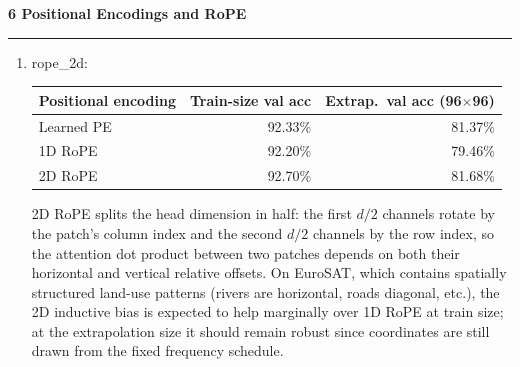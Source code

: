 \documentclass[11pt]{article}
\newenvironment{question}[1]
    {
        \begin{center}
        \textbf{#1} \rmfamily
        \bigskip
        \hrule
    }
    {
        \end{center}
    }
\begin{document}
\begin{question}{6 Positional Encodings and RoPE}
\begin{enumerate}[label=\textbf{\arabic*.}]
    At train size both methods perform nearly identically (92.33\% vs.\ 92.20\%),
    confirming that the positional encoding choice is not a bottleneck for
    in-distribution accuracy.
    At the extrapolation size, learned PE (81.37\%) somewhat surprisingly
    outperforms 1D RoPE (79.46\%) by about 1.9 points.
    A likely explanation is that EuroSAT land-use patterns are locally smooth,
    so bilinear interpolation of the $8\times8$ learned embeddings to a
    $12\times12$ grid preserves the coarse positional structure well enough for
    the classification task; the overall accuracy drop ($\approx$\,11 pp) is
    driven by the larger number of patches and the resulting longer input
    sequence rather than by the encoding strategy itself.
    1D RoPE's slight disadvantage may stem from treating all 145 tokens (CLS $+$
    144 patches) as a flat 1D sequence: the absolute positions 0--144 are within
    the cosine/sine cache range, but the model was never trained to rely on
    relative distances larger than 64, so the learned query--key dot-products
    do not generalise perfectly to longer offsets.

    \item rope\_2d:

    \begin{center}
    \begin{tabular}{lrr}
    \toprule
    Positional encoding & Train-size val acc & Extrap.\ val acc (96$\times$96) \\
    \midrule
    Learned PE          & 92.33\% & 81.37\% \\
    1D RoPE             & 92.20\% & 79.46\% \\
    2D RoPE             & 92.70\% & 81.68\% \\
    \bottomrule
    \end{tabular}
    \end{center}

    2D RoPE splits the head dimension in half: the first $d/2$ channels rotate
    by the patch's column index and the second $d/2$ channels by the row index,
    so the attention dot product between two patches depends on both their
    horizontal and vertical relative offsets.
    On EuroSAT, which contains spatially structured land-use patterns (rivers
    are horizontal, roads diagonal, etc.), the 2D inductive bias is expected to
    help marginally over 1D RoPE at train size; at the extrapolation size it
    should remain robust since coordinates are still drawn from the fixed
    frequency schedule.


\end{enumerate}
\end{question}
\end{document}
